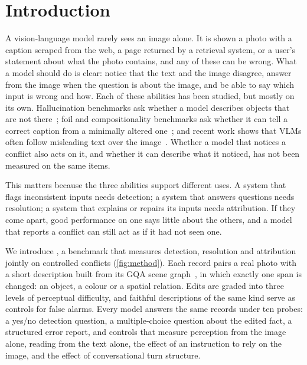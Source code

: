 \section{Introduction}
\label{sec:intro}

A vision-language model rarely sees an image alone. It is shown a photo with a caption scraped from the web, a page returned by a retrieval system, or a user's statement about what the photo contains, and any of these can be wrong. What a model should do is clear: notice that the text and the image disagree, answer from the image when the question is about the image, and be able to say which input is wrong and how. Each of these abilities has been studied, but mostly on its own. Hallucination benchmarks ask whether a model describes objects that are not there~\cite{rohrbach2018object,li2023pope,guan2024hallusionbench}; foil and compositionality benchmarks ask whether it can tell a correct caption from a minimally altered one~\cite{shekhar2017foil,parcalabescu2022valse,thrush2022winoground,hsieh2023sugarcrepe}; and recent work shows that VLMs often follow misleading text over the image~\cite{deng2025words}. Whether a model that notices a conflict also acts on it, and whether it can describe what it noticed, has not been measured on the same items.

This matters because the three abilities support different uses. A system that flags inconsistent inputs needs detection; a system that answers questions needs resolution; a system that explains or repairs its inputs needs attribution. If they come apart, good performance on one says little about the others, and a model that reports a conflict can still act as if it had not seen one.

We introduce \name, a benchmark that measures detection, resolution and attribution jointly on controlled conflicts (\cref{fig:method}). Each record pairs a real photo with a short description built from its GQA scene graph~\cite{hudson2019gqa}, in which exactly one span is changed: an object, a colour or a spatial relation. Edits are graded into three levels of perceptual difficulty, and faithful descriptions of the same kind serve as controls for false alarms. Every model answers the same records under ten probes: a yes/no detection question, a multiple-choice question about the edited fact, a structured error report, and controls that measure perception from the image alone, reading from the text alone, the effect of an instruction to rely on the image, and the effect of conversational turn structure.

